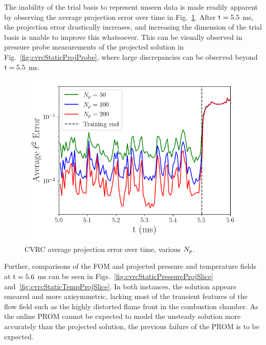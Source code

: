 The inability of the trial basis to represent unseen data is made readily apparent by observing the average projection error over time in Fig.~\ref{fig:cvrcStaticProjTime}. After $\text{t} = 5.5$ ms, the projection error drastically increases, and increasing the dimension of the trial basis is unable to improve this whatsoever. This can be visually observed in pressure probe measurements of the projected solution in Fig.~\ref{fig:cvrcStaticProjProbe}, where large discrepancies can be observed beyond $\text{t} = 5.5$ ms. 

\begin{figure}
    \centering
    \includegraphics[width=0.75\linewidth]{Chapters/AdaptiveResults/Images/cvrc/proj_err_time.png}
    \caption{\label{fig:cvrcStaticProjTime}CVRC average projection error over time, various $N_p$.}
\end{figure}

Further, comparisons of the FOM and projected pressure and temperature fields at $\text{t} = 5.6$ ms can be seen in Figs.~\ref{fig:cvrcStaticPressureProjSlice} and~\ref{fig:cvrcStaticTempProjSlice}. In both instances, the solution appears smeared and more axisymmetric, lacking most of the transient features of the flow field such as the  highly distorted flame front in the combustion chamber. As the online PROM cannot be expected to model the unsteady solution more accurately than the projected solution, the previous failure of the PROM is to be expected.

